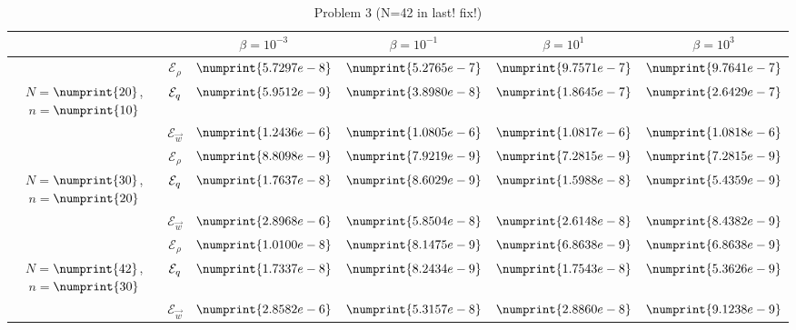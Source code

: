 \begin{table}
\begin{tabular}{ ||c|| c | c | c | c | c ||}
\hline
& & $\beta = 10^{-3}$ & $\beta = 10^{-1}$ & $\beta = 10^{1}$ & $\beta = 10^{3}$  \\
\hline
 & $\mathcal{E}_\rho$ & $\numprint{5.7297e-8}$ & $\numprint{5.2765e-7}$ & $\numprint{9.7571e-7}$ & $\numprint{9.7641e-7}$ \\
 $N = $$\numprint{20}$, $n = $$\numprint{10}$  & $\mathcal{E}_q$ & $\numprint{5.9512e-9}$ & $\numprint{3.8980e-8}$ & $\numprint{1.8645e-7}$ & $\numprint{2.6429e-7}$ \\
& $\mathcal{E}_{\vec{w}}$ & $\numprint{1.2436e-6}$ & $\numprint{1.0805e-6}$ & $\numprint{1.0817e-6}$ & $\numprint{1.0818e-6}$ \\
\hline
 & $\mathcal{E}_\rho$ & $\numprint{8.8098e-9}$ & $\numprint{7.9219e-9}$ & $\numprint{7.2815e-9}$ & $\numprint{7.2815e-9}$ \\
 $N = $$\numprint{30}$, $n = $$\numprint{20}$  & $\mathcal{E}_q$ & $\numprint{1.7637e-8}$ & $\numprint{8.6029e-9}$ & $\numprint{1.5988e-8}$ & $\numprint{5.4359e-9}$ \\
& $\mathcal{E}_{\vec{w}}$ & $\numprint{2.8968e-6}$ & $\numprint{5.8504e-8}$ & $\numprint{2.6148e-8}$ & $\numprint{8.4382e-9}$ \\
\hline
 & $\mathcal{E}_\rho$ & $\numprint{1.0100e-8}$ & $\numprint{8.1475e-9}$ & $\numprint{6.8638e-9}$ & $\numprint{6.8638e-9}$ \\
 $N = $$\numprint{42}$, $n = $$\numprint{30}$  & $\mathcal{E}_q$ & $\numprint{1.7337e-8}$ & $\numprint{8.2434e-9}$ & $\numprint{1.7543e-8}$ & $\numprint{5.3626e-9}$ \\
& $\mathcal{E}_{\vec{w}}$ & $\numprint{2.8582e-6}$ & $\numprint{5.3157e-8}$ & $\numprint{2.8860e-8}$ & $\numprint{9.1238e-9}$ \\
\hline
\end{tabular}
\caption{Problem 3 (N=42 in last! fix!)}
\label{TabA1:Prob3}
\end{table}